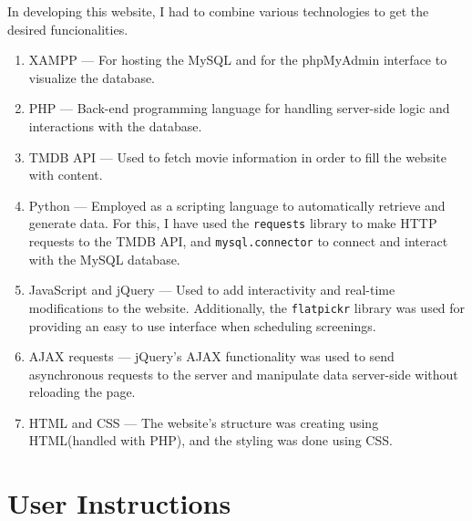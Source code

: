 \documentclass[a4paper]{article}
\begin{document}
In developing this website, I had to combine various technologies to get the desired funcionalities.

\begin{enumerate}[label=$-$]
    \item XAMPP --- For hosting the MySQL and for the phpMyAdmin interface to visualize the database.
    \item PHP --- Back-end programming language for handling server-side logic and interactions with the database.
    \item TMDB API --- Used to fetch movie information in order to fill the website with content.
    \item Python --- Employed as a scripting language to automatically retrieve and generate data. For this, I have used the \texttt{requests} library to make HTTP requests to the TMDB API, and \texttt{mysql.connector} to connect and interact with the MySQL database.
    \item JavaScript and jQuery --- Used to add interactivity and real-time modifications to the website. Additionally, the \texttt{flatpickr} library was used for providing an easy to use interface when scheduling screenings.
    \item AJAX requests --- jQuery's AJAX functionality was used to send asynchronous requests to the server and manipulate data server-side without reloading the page.
    \item HTML and CSS --- The website's structure was creating using HTML(handled with PHP), and the styling was done using CSS.
\end{enumerate}

\section*{User Instructions}
\end{document}
